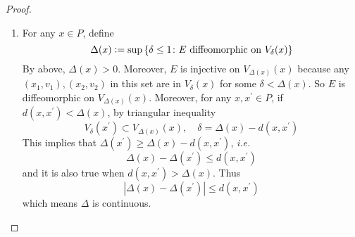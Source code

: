 \begin{enumerate}[label=\arabic{*}.]
\begin{proof}
\begin{enumerate}[label=(\roman*)]
		    \item For any $x \in P$, define
		    \begin{equation*}
		        \Delta(x) \vcentcolon= \sup\left\{\delta \leq 1 \colon E \text{ diffeomorphic on } V_{\delta}(x)\right\}
		    \end{equation*}
		    By above, $\Delta(x) > 0$. Moreover, $E$ is injective on $V_{\Delta(x)}(x)$ because any $\left(x_1, v_1\right),\left(x_2, v_2\right)$ in this set are in $V_\delta(x)$ for some $\delta<\Delta(x)$. So $E$ is diffeomorphic on $V_{\Delta(x)}(x)$. Moreover, for any $x,x^\prime \in P$, if $d(x,x^\prime) < \Delta(x)$, by triangular inequality
		    \begin{equation*}
		       V_\delta(x^\prime) \subset V_{\Delta(x)}(x),\quad \delta = \Delta(x) - d(x,x^\prime)
		    \end{equation*}
		    This implies that $\Delta(x^\prime) \geq \Delta(x) - d(x,x^\prime)$, \emph{i.e.}
		    \begin{equation*}
		        \Delta(x)-\Delta\left(x^{\prime}\right) \leq d\left(x, x^{\prime}\right)
		    \end{equation*}
		    and it is also true when $d(x,x^\prime) > \Delta(x)$. Thus
		    \begin{equation*}
		        \left|\Delta(x)-\Delta\left(x^{\prime}\right)\right| \leq d\left(x, x^{\prime}\right)
		    \end{equation*}
		    which means $\Delta$ is continuous.


\end{enumerate}
\end{proof}
\end{enumerate}
